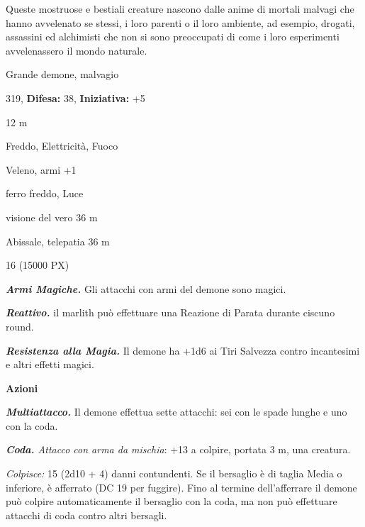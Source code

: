 \begin{multicols}{2}
{Queste mostruose e bestiali creature nascono dalle anime di mortali malvagi che hanno avvelenato se stessi, i loro parenti o il loro ambiente, ad esempio, drogati, assassini ed alchimisti che non si sono preoccupati di come i loro esperimenti avvelenassero il mondo naturale.

\noindent
\begin{description}[noitemsep, topsep=0pt, parsep=0pt, partopsep=0pt, leftmargin=0cm, labelwidth=2.2cm]
	\item[\textbf{Taglia/Tipo:}] Grande demone, malvagio
	\item[\textbf{Caratt.:}] 
	\item[\textbf{Punti Ferita:}] 319,  \textbf{Difesa:} 38,  \textbf{Iniziativa:} +5
	\item[\textbf{Movimento:}] 12 m
	\item[\textbf{Tiri Salvez.:}] 
	\item[\textbf{Res. Danni:}] Freddo, Elettricità, Fuoco
	\item[\textbf{Imm. Danni:}] Veleno, armi +1
	\item[\textbf{Vulnerabilità:}] ferro freddo, Luce
	\item[\textbf{Sensi:}] visione del vero 36 m
	\item[\textbf{Linguaggi:}] Abissale, telepatia 36 m
	\item[\textbf{Sfida:}] 16 (15000 PX)\smallskip
\end{description}

\emph{\textbf{Armi Magiche.}} Gli attacchi con armi del demone sono magici.

\emph{\textbf{Reattivo.}} il marlith può effettuare una Reazione di Parata durante ciscuno round.

\emph{\textbf{Resistenza alla Magia.}} Il demone ha +1d6 ai Tiri Salvezza contro incantesimi e altri effetti magici.

\textbf{Azioni}

\emph{\textbf{Multiattacco.}} Il demone effettua sette attacchi: sei con le spade lunghe e uno con la coda.

\emph{\textbf{Coda.} Attacco con arma da mischia}: +13 a colpire, portata 3 m, una creatura.

\emph{Colpisce:} 15 (2d10 + 4) danni contundenti. Se il bersaglio è di taglia Media o inferiore, è afferrato (DC 19 per fuggire). Fino al termine dell'afferrare il demone può colpire automaticamente il bersaglio con la coda, ma non può effettuare attacchi di coda contro altri bersagli.

}
\end{multicols}
